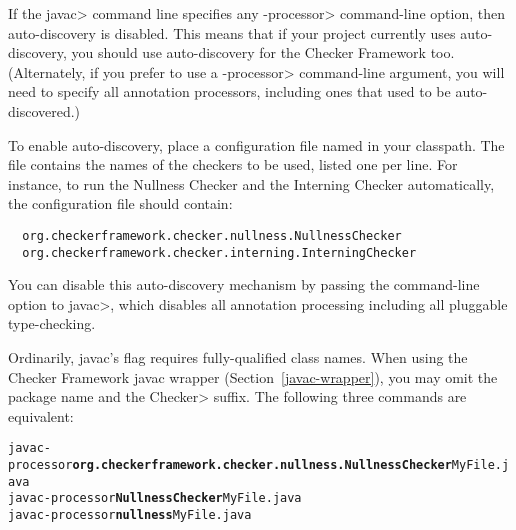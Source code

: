 If the \<javac> command line specifies any \<-processor> command-line
option, then auto-discovery is disabled.  This means that if your project
currently uses auto-discovery, you should use auto-discovery for the
Checker Framework too.  (Alternately, if you prefer to use a \<-processor>
command-line argument, you will need to specify all annotation processors,
including ones that used to be auto-discovered.)

\begin{sloppypar}
To enable auto-discovery, place a configuration file named
in your classpath.  The file contains the names of the checkers to
be used, listed one per line.  For instance, to run the Nullness Checker and the
Interning Checker automatically, the configuration file should contain:
\end{sloppypar}

\begin{smaller}
\begin{Verbatim}
  org.checkerframework.checker.nullness.NullnessChecker
  org.checkerframework.checker.interning.InterningChecker
\end{Verbatim}
\end{smaller}

You can disable this auto-discovery mechanism by passing the
 command-line option to \<javac>, which disables all
annotation processing including all pluggable type-checking.





Ordinarily, javac's  flag requires fully-qualified class names.
When using the Checker Framework javac wrapper (Section~\ref{javac-wrapper}), you may
omit the package name and the \<Checker> suffix.
The following three commands are equivalent:

\begin{alltt}
  javac -processor \textbf{org.checkerframework.checker.nullness.NullnessChecker} MyFile.java
  javac -processor \textbf{NullnessChecker} MyFile.java
  javac -processor \textbf{nullness} MyFile.java
\end{alltt}

